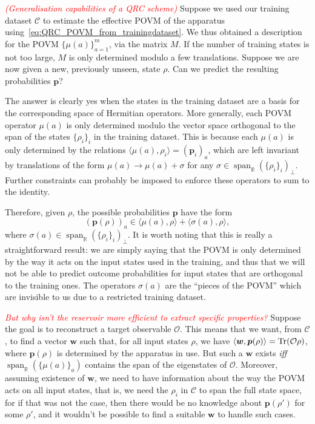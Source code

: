 \documentclass[12pt]{report}
\newcommand{\RR}{\mathbb{R}}
\newcommand{\on}[1]{\operatorname{#1}}
\newcommand{\bs}[1]{\boldsymbol{#1}}
\newcommand{\calC}{{\mathcal{C}}}
\newcommand{\calO}{{\mathcal{O}}}
\begin{document}
\textcolor{red}{\emph{(Generalisation capabilities of a QRC scheme)}}
Suppose we used our training dataset $\calC$ to estimate the effective POVM of the apparatus using~\cref{eq:QRC_POVM_from_trainingdataset}.
We thus obtained a description for the POVM $\{\mu(a)\}_{a=1}^m$, via the matrix $M$.
If the number of training states is not too large, $M$ is only determined modulo a few translations.
Suppose we are now given a new, previously unseen, state $\rho$.
Can we predict the resulting probabilities $\bs p$?

The answer is clearly yes when the states in the training dataset are a basis for the corresponding space of Hermitian operators.
More generally, each POVM operator $\mu(a)$ is only determined modulo the vector space orthogonal to the span of the states $\{\rho_i\}_i$ in the training dataset. This is because each $\mu(a)$ is only determined by the relations
	$\langle \mu(a), \rho_i \rangle = (\bs p_i)_a$,
which are left invariant by translations of the form
$\mu(a)\to \mu(a) + \sigma$ for any $\sigma\in\on{span}_\RR(\{\rho_i\}_i)_\perp$.
Further constraints can probably be imposed to enforce these operators to sum to the identity.

Therefore, given $\rho$, the possible probabilities $\bs p$ have the form
\begin{equation}
	(\bs p(\rho))_a \in \langle \mu(a), \rho\rangle + \langle \sigma(a),\rho\rangle,
\end{equation}
where $\sigma(a)\in\on{span}_\RR(\{\rho_i\}_i)_\perp$.
It is worth noting that this is really a straightforward result: we are simply saying that the POVM is only determined by the way it acts on the input states used in the training, and thus that we will not be able to predict outcome probabilities for input states that are orthogonal to the training ones.
The operators $\sigma(a)$ are the ``pieces of the POVM'' which are invisible to us due to a restricted training dataset.

\textcolor{red}{\emph{But why isn't the reservoir more efficient to extract specific properties?}}
Suppose the goal is to reconstruct a target observable $\calO$.
This means that we want, from $\calC$, to find a vector $\bs w$ such that, for all input states $\rho$, we have
$\langle \bs w, \bs p(\rho)\rangle = \Tr(\calO\rho)$,
where $\bs p(\rho)$ is determined by the apparatus in use.
But such a $\bs w$ exists \emph{iff} $\on{span}_\RR(\{\mu(a)\}_a)$ contains the span of the eigenstates of $\calO$.
Moreover, assuming existence of $\bs w$, we need to have information about the way the POVM acts on all input states, that is, we need the $\rho_i$ in $\calC$ to span the full state space, for if that was not the case, then there would be no knowledge about $\bs p(\rho')$ for some $\rho'$, and it wouldn't be possible to find a suitable $\bs w$ to handle such cases.
\end{document}
